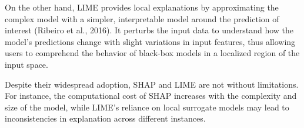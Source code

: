 On the other hand, LIME provides local explanations by approximating the complex model with a simpler, interpretable model around the prediction of interest (Ribeiro et al., 2016). It perturbs the input data to understand how the model's predictions change with slight variations in input features, thus allowing users to comprehend the behavior of black-box models in a localized region of the input space.

Despite their widespread adoption, SHAP and LIME are not without limitations. For instance, the computational cost of SHAP increases with the complexity and size of the model, while LIME's reliance on local surrogate models may lead to inconsistencies in explanation across different instances.

